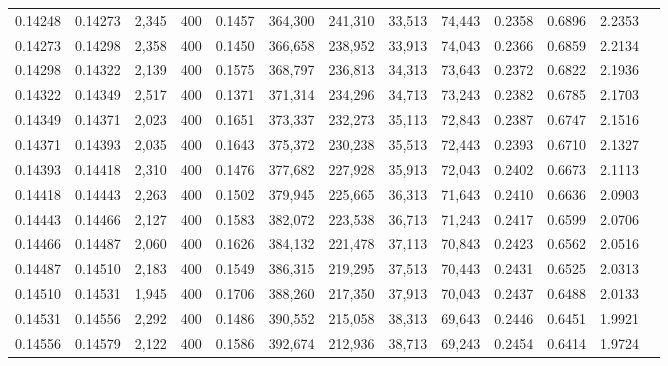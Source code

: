 \begin{tabular}{rrrrrrrrrrrrr}
0.14248 & 0.14273 &  2,345 &   400 &                                     0.1457 & 364,300 & 241,310 &  33,513 &  74,443 & 0.2358 & 0.6896 & 2.2353 \\
0.14273 & 0.14298 &  2,358 &   400 &                                     0.1450 & 366,658 & 238,952 &  33,913 &  74,043 & 0.2366 & 0.6859 & 2.2134 \\
0.14298 & 0.14322 &  2,139 &   400 &                                     0.1575 & 368,797 & 236,813 &  34,313 &  73,643 & 0.2372 & 0.6822 & 2.1936 \\
0.14322 & 0.14349 &  2,517 &   400 &                                     0.1371 & 371,314 & 234,296 &  34,713 &  73,243 & 0.2382 & 0.6785 & 2.1703 \\
0.14349 & 0.14371 &  2,023 &   400 &                                     0.1651 & 373,337 & 232,273 &  35,113 &  72,843 & 0.2387 & 0.6747 & 2.1516 \\
0.14371 & 0.14393 &  2,035 &   400 &                                     0.1643 & 375,372 & 230,238 &  35,513 &  72,443 & 0.2393 & 0.6710 & 2.1327 \\
0.14393 & 0.14418 &  2,310 &   400 &                                     0.1476 & 377,682 & 227,928 &  35,913 &  72,043 & 0.2402 & 0.6673 & 2.1113 \\
0.14418 & 0.14443 &  2,263 &   400 &                                     0.1502 & 379,945 & 225,665 &  36,313 &  71,643 & 0.2410 & 0.6636 & 2.0903 \\
0.14443 & 0.14466 &  2,127 &   400 &                                     0.1583 & 382,072 & 223,538 &  36,713 &  71,243 & 0.2417 & 0.6599 & 2.0706 \\
0.14466 & 0.14487 &  2,060 &   400 &                                     0.1626 & 384,132 & 221,478 &  37,113 &  70,843 & 0.2423 & 0.6562 & 2.0516 \\
0.14487 & 0.14510 &  2,183 &   400 &                                     0.1549 & 386,315 & 219,295 &  37,513 &  70,443 & 0.2431 & 0.6525 & 2.0313 \\
0.14510 & 0.14531 &  1,945 &   400 &                                     0.1706 & 388,260 & 217,350 &  37,913 &  70,043 & 0.2437 & 0.6488 & 2.0133 \\
0.14531 & 0.14556 &  2,292 &   400 &                                     0.1486 & 390,552 & 215,058 &  38,313 &  69,643 & 0.2446 & 0.6451 & 1.9921 \\
0.14556 & 0.14579 &  2,122 &   400 &                                     0.1586 & 392,674 & 212,936 &  38,713 &  69,243 & 0.2454 & 0.6414 & 1.9724 \\

\end{tabular}
